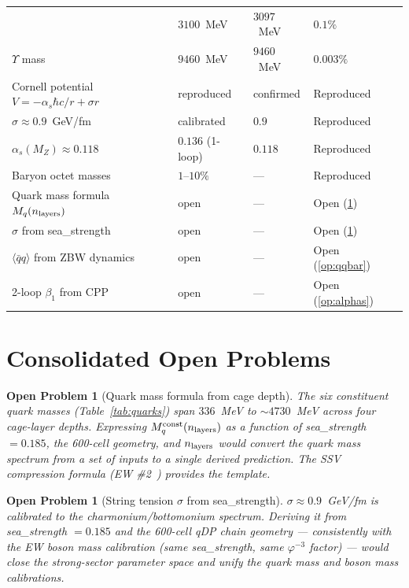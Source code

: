 \documentclass[11pt,a4paper]{article}
\newtheorem{openprob}[theorem]{Open Problem}
\newcommand{\phig}{\varphi}
\newcommand{\as}{\alpha_s}
\newcommand{\qqbar}{\langle\bar{q}q\rangle}
\begin{document}
\begin{longtable}{@{}p{5.5cm}p{2.5cm}p{2.5cm}l@{}}
  & $3100$~MeV & $3097$~MeV & $0.1\%$ \\
$\Upsilon$ mass
  & $9460$~MeV & $9460$~MeV & $0.003\%$ \\
Cornell potential $V=-\as\hbar c/r+\sigma r$
  & reproduced & confirmed & Reproduced \\
$\sigma \approx 0.9$~GeV/fm
  & calibrated & $0.9$ & Reproduced \\
$\as(M_Z) \approx 0.118$
  & $0.136$ (1-loop) & $0.118$ & Reproduced \\
Baryon octet masses
  & $1\text{--}10\%$ & --- & Reproduced \\
Quark mass formula $M_q(n_{\rm layers})$
  & open & --- & Open (\ref{op:mq}) \\
$\sigma$ from sea\_strength
  & open & --- & Open (\ref{op:sigma}) \\
$\qqbar$ from ZBW dynamics
  & open & --- & Open (\ref{op:qqbar}) \\
2-loop $\beta_1$ from CPP
  & open & --- & Open (\ref{op:alphas}) \\
\end{longtable}

\section{Consolidated Open Problems}
\label{sec:openproblems}

\begin{openprob}[Quark mass formula from cage depth]
\label{op:mq}
The six constituent quark masses (Table~\ref{tab:quarks}) span
$336$~MeV to $\sim 4730$~MeV across four cage-layer depths.
Expressing $M_q^{\rm const}(n_{\rm layers})$ as a function of
sea\_strength $= 0.185$, the 600-cell geometry, and $n_{\rm layers}$
would convert the quark mass spectrum from a set of inputs to a
single derived prediction.  The SSV compression formula (EW
\#2~\citep{cpp_ew2}) provides the template.
\end{openprob}

\begin{openprob}[String tension $\sigma$ from sea\_strength]
\label{op:sigma}
$\sigma \approx 0.9$~GeV/fm is calibrated to the charmonium/bottomonium
spectrum.  Deriving it from sea\_strength $= 0.185$ and the 600-cell
qDP chain geometry --- consistently with the EW boson mass
calibration (same sea\_strength, same $\phig^{-3}$ factor) ---
would close the strong-sector parameter space and unify the quark
mass and boson mass calibrations.
\end{openprob}
\end{document}
